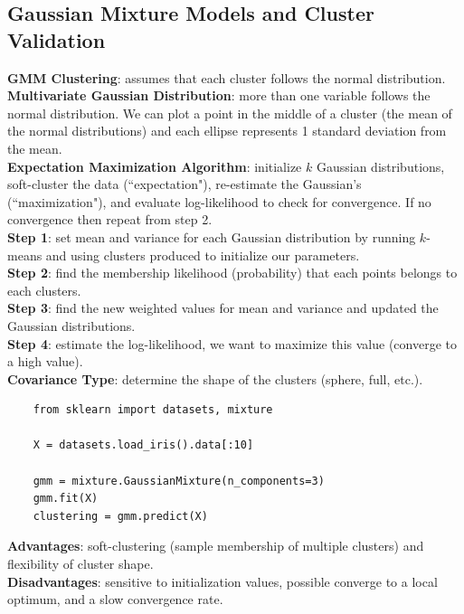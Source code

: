 \documentclass[11pt, a4paper]{article}
\begin{document}
\begin{spacing}{1.1}
	\subsection{Gaussian Mixture Models and Cluster Validation}
	\textbf{GMM Clustering}: assumes that each cluster follows the normal distribution.\vspace*{2mm}\\
	\textbf{Multivariate Gaussian Distribution}: more than one variable follows the normal distribution. We can plot a point in the middle of a cluster (the mean of the normal distributions) and each ellipse represents 1 standard deviation from the mean. \vspace*{2mm}\\
	\textbf{Expectation Maximization Algorithm}: initialize $k$ Gaussian distributions, soft-cluster the data (``expectation"), re-estimate the Gaussian's (``maximization"), and evaluate log-likelihood to check for convergence. If no convergence then repeat from step 2. \vspace*{2mm}\\
	\textbf{Step 1}: set mean and variance for each Gaussian distribution by running $k$-means and using clusters produced to initialize our parameters.\vspace*{2mm}\\
	\textbf{Step 2}: find the membership likelihood (probability) that each points belongs to each clusters.\vspace*{2mm}\\
	\textbf{Step 3}: find the new weighted values for mean and variance and updated the Gaussian distributions.\vspace*{2mm}\\
	\textbf{Step 4}: estimate the log-likelihood, we want to maximize this value (converge to a high value).\vspace*{2mm}\\
	\textbf{Covariance Type}: determine the shape of the clusters (sphere, full, etc.).
	\begin{lstlisting}
	from sklearn import datasets, mixture
	
	X = datasets.load_iris().data[:10]
	
	gmm = mixture.GaussianMixture(n_components=3)
	gmm.fit(X)
	clustering = gmm.predict(X)
	\end{lstlisting} \vspace*{2mm}
	\textbf{Advantages}: soft-clustering (sample membership of multiple clusters) and flexibility of cluster shape.\vspace*{2mm}\\
	\textbf{Disadvantages}: sensitive to initialization values, possible converge to a local optimum, and a slow convergence rate.\vspace*{2mm}
	

\end{spacing}
\end{document}
